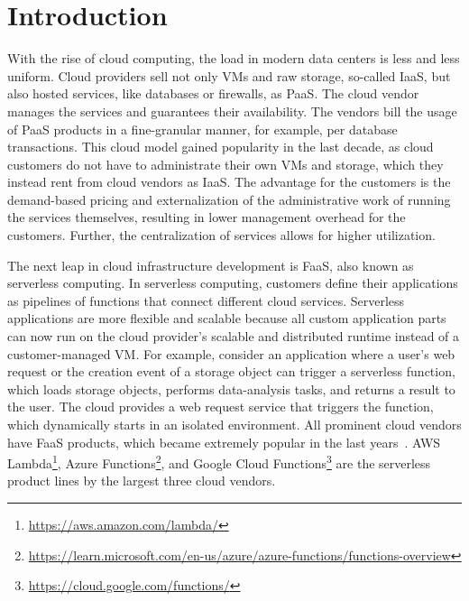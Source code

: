 \chapter{Introduction}\label{chapter:motivation}\thispagestyle{scrheadings}

With the rise of cloud computing, the load in modern data centers is less and less uniform. %
Cloud providers sell not only \acp{VM} and raw storage, so-called \ac{IaaS}, but also hosted services, like databases or firewalls, as \ac{PaaS}. The cloud vendor manages the services and guarantees their availability. The vendors bill the usage of \ac{PaaS} products in a fine-granular manner, for example, per database transactions. This cloud model gained popularity in the last decade, as cloud customers do not have to administrate their own \acp{VM} and storage, which they instead rent from cloud vendors as \ac{IaaS}. The advantage for the customers is the demand-based pricing and externalization of the administrative work of running the services themselves, resulting in lower management overhead for the customers. Further, the centralization of services allows for higher utilization.

The next leap in cloud infrastructure development is \ac{FaaS}, also known as serverless computing. In serverless computing, customers define their applications as pipelines of functions that connect different cloud services. Serverless applications are more flexible and scalable because all custom application parts can now run on the cloud provider's scalable and distributed runtime instead of a customer-managed \ac{VM}. For example, consider an application where a user's web request or the creation event of a storage object can trigger a serverless function, which loads storage objects, performs data-analysis tasks, and returns a result to the user. The cloud provides a web request service that triggers the function, which dynamically starts in an isolated environment. All prominent cloud vendors have \ac{FaaS} products, which became extremely popular in the last years~\cite{eskandaniUphillJourneyFaaS2023, datadogStateServerless, schleier-smithWhatServerlessComputing2021}\@.
\ac{AWS} Lambda\footnote{\url{https://aws.amazon.com/lambda/}}, Azure Functions\footnote{\url{https://learn.microsoft.com/en-us/azure/azure-functions/functions-overview}}, and Google Cloud Functions\footnote{\url{https://cloud.google.com/functions/}} are the serverless product lines by the largest three cloud vendors.

